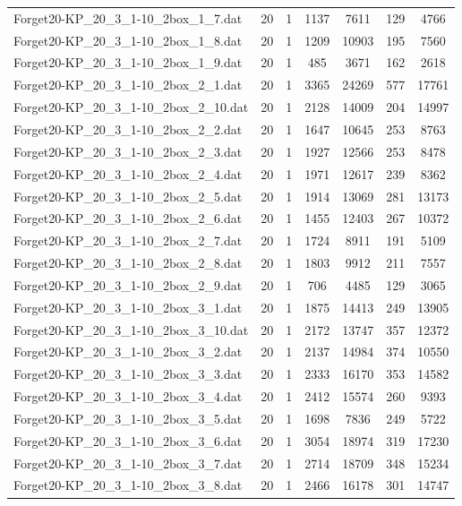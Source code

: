 \begin{table}[!ht]
\begin{tabular}{lcccccc}
Forget20-KP\_20\_3\_1-10\_2box\_1\_7.dat & 20 & 1 & 1137 & 7611 & 129 & 4766 \\
Forget20-KP\_20\_3\_1-10\_2box\_1\_8.dat & 20 & 1 & 1209 & 10903 & 195 & 7560 \\
Forget20-KP\_20\_3\_1-10\_2box\_1\_9.dat & 20 & 1 & 485 & 3671 & 162 & 2618 \\
Forget20-KP\_20\_3\_1-10\_2box\_2\_1.dat & 20 & 1 & 3365 & 24269 & 577 & 17761 \\
Forget20-KP\_20\_3\_1-10\_2box\_2\_10.dat & 20 & 1 & 2128 & 14009 & 204 & 14997 \\
Forget20-KP\_20\_3\_1-10\_2box\_2\_2.dat & 20 & 1 & 1647 & 10645 & 253 & 8763 \\
Forget20-KP\_20\_3\_1-10\_2box\_2\_3.dat & 20 & 1 & 1927 & 12566 & 253 & 8478 \\
Forget20-KP\_20\_3\_1-10\_2box\_2\_4.dat & 20 & 1 & 1971 & 12617 & 239 & 8362 \\
Forget20-KP\_20\_3\_1-10\_2box\_2\_5.dat & 20 & 1 & 1914 & 13069 & 281 & 13173 \\
Forget20-KP\_20\_3\_1-10\_2box\_2\_6.dat & 20 & 1 & 1455 & 12403 & 267 & 10372 \\
Forget20-KP\_20\_3\_1-10\_2box\_2\_7.dat & 20 & 1 & 1724 & 8911 & 191 & 5109 \\
Forget20-KP\_20\_3\_1-10\_2box\_2\_8.dat & 20 & 1 & 1803 & 9912 & 211 & 7557 \\
Forget20-KP\_20\_3\_1-10\_2box\_2\_9.dat & 20 & 1 & 706 & 4485 & 129 & 3065 \\
Forget20-KP\_20\_3\_1-10\_2box\_3\_1.dat & 20 & 1 & 1875 & 14413 & 249 & 13905 \\
Forget20-KP\_20\_3\_1-10\_2box\_3\_10.dat & 20 & 1 & 2172 & 13747 & 357 & 12372 \\
Forget20-KP\_20\_3\_1-10\_2box\_3\_2.dat & 20 & 1 & 2137 & 14984 & 374 & 10550 \\
Forget20-KP\_20\_3\_1-10\_2box\_3\_3.dat & 20 & 1 & 2333 & 16170 & 353 & 14582 \\
Forget20-KP\_20\_3\_1-10\_2box\_3\_4.dat & 20 & 1 & 2412 & 15574 & 260 & 9393 \\
Forget20-KP\_20\_3\_1-10\_2box\_3\_5.dat & 20 & 1 & 1698 & 7836 & 249 & 5722 \\
Forget20-KP\_20\_3\_1-10\_2box\_3\_6.dat & 20 & 1 & 3054 & 18974 & 319 & 17230 \\
Forget20-KP\_20\_3\_1-10\_2box\_3\_7.dat & 20 & 1 & 2714 & 18709 & 348 & 15234 \\
Forget20-KP\_20\_3\_1-10\_2box\_3\_8.dat & 20 & 1 & 2466 & 16178 & 301 & 14747 \\

\end{tabular}
\end{table}
